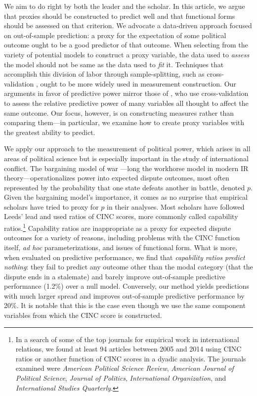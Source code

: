 We aim to do right by both the leader and the scholar.
In this article, we argue that proxies should be constructed to predict well and that functional forms should be assessed on that criterion.
We advocate a data-driven approach focused on out-of-sample prediction: a proxy for the expectation of some political outcome ought to be a good predictor of that outcome.
When selecting from the variety of potential models to construct a proxy variable, the data used to \emph{assess} the model should not be same as the data used to \emph{fit} it.
Techniques that accomplish this division of labor through sample-splitting, such as cross-validation \citep{Efron:2012es}, ought to be more widely used in measurement construction.
Our arguments in favor of predictive power mirror those of \citet{Hill:2014ki}, who use cross-validation to assess the relative predictive power of many variables all thought to affect the same outcome.
Our focus, however, is on constructing measures rather than comparing them---in particular, we examine how to create proxy variables with the greatest ability to predict.

We apply our approach to the measurement of political power, which arises in all areas of political science but is especially important in the study of international conflict.
The bargaining model of war \citep{fearon1995}---long the workhorse model in modern IR theory---operationalizes power into expected dispute outcomes, most often represented by the probability that one state defeats another in battle, denoted $p$.
Given the bargaining model's importance, it comes as no surprise that empirical scholars have tried to proxy for $p$ in their analyses.
Most scholars have followed Leeds' lead and used ratios of CINC scores, more commonly called capability ratios.\footnote{
  \label{fn:replications}
  In a search of some of the top journals for empirical work in international relations, we found at least 94 articles between 2005 and 2014 using CINC ratios or another function of CINC scores in a dyadic analysis.
  The journals examined were \emph{American Political Science Review}, \emph{American Journal of Political Science}, \emph{Journal of Politics}, \emph{International Organization}, and \emph{International Studies Quarterly}.
}
Capability ratios are inappropriate as a proxy for expected dispute outcomes for a variety of reasons, including problems with the CINC function itself, \emph{ad hoc} parameterizations, and issues of functional form.
What is more, when evaluated on predictive performance, we find that \emph{capability ratios predict nothing}: they fail to predict any outcome other than the modal category (that the dispute ends in a stalemate) and barely improve out-of-sample predictive performance (1.2\%) over a null model.
Conversely, our method yields predictions with much larger spread and improves out-of-sample predictive performance by 20\%.
It is notable that this is the case even though we use the same component variables from which the CINC score is constructed.

